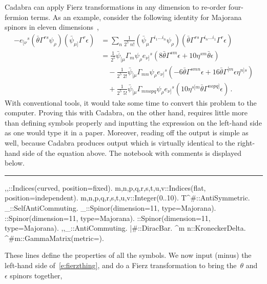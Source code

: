 \documentclass[11pt]{article}
\newenvironment{hanging}
    {\begin{list}{}{\setlength\itemsep{0pt}%
 \setlength\topsep{0pt}%
 \setlength\leftmargin{25pt}%
 \setlength\itemindent{0pt}%
 \setlength\listparindent{\itemindent}}%
     \item[]}
    {\end{list}}
\newcommand{\toprule}{\par\vspace{1ex}\noindent\hspace{25pt}\rule{435pt}{.1pt}}
\newenvironment{cdbin}{\fvset{firstnumber=1}\color[named]{Blue}\Verbatim}{\endVerbatim}
\newenvironment{cdbcom}{\begin{hanging}}{\end{hanging}}
\newcommand{\Cdb}{{Cadabra}\xspace}
\begin{document}
\Cdb can apply Fierz transformations in any dimension to re-order
four-fermion terms. As an example, consider the following identity for
Majorana spinors in eleven dimensions~\cite{deWit:1998tk},
\begin{equation}
\begin{aligned}
\label{e:fierzthing}
-e_{[\nu}{}^s (\bar \theta \Gamma^{rs} \psi_\rho)(\bar\psi_{\mu]} \Gamma^r \epsilon) &=
\sum_{n} \frac{1}{2^5\; n!} (\bar\psi_\mu \Gamma^{i_1\ldots i_n} \psi_\rho)
(\bar\theta \Gamma^{rs} \Gamma^{i_n\ldots i_1} \Gamma^{r} \epsilon) \\
&= \frac{1}{2^5} \bar\psi_{[\mu} \Gamma_m \psi_\rho e_{\nu]}{}^s \left( 8 \bar\theta \Gamma^{sm}\epsilon
+ 10 \eta^{sm} \bar\theta\epsilon\right) \\
&\quad - \frac{1}{2^5\; 2!} \bar\psi_{[\mu}\Gamma_{mn} \psi_\rho e_{\nu]}{}^s\left(
-6 \bar\theta\Gamma^{smn} \epsilon + 16\bar\theta \Gamma^{[m} \epsilon \eta^{n]s}\right)\\
&\quad + \frac{1}{2^5\; 5!} \bar\psi_{[\mu}\Gamma_{mnopq} \psi_\rho e_{\nu]}{}^s \left(
10 \eta^{s[m} \bar\theta\Gamma^{nopq]} \epsilon\right) \, .
\end{aligned}
\end{equation}
With conventional tools, it would take some time to convert this
problem to the computer. Proving this with \Cdb, on the other hand,
requires little more than defining symbols properly and inputting the
expression on the left-hand side as one would type it in a
paper. Moreover, reading off the output is simple as well, because \Cdb produces
output which is virtually identical to the right-hand side of the
equation above. The notebook with comments is displayed below.
\toprule
\begin{cdbin}
{\mu,\nu,\rho}::Indices(curved, position=fixed).
{m,n,p,q,r,s,t,u,v}::Indices(flat, position=independent).
{m,n,p,q,r,s,t,u,v}::Integer(0..10).
T^{#{\mu}}::AntiSymmetric.
\psi_{\mu}::SelfAntiCommuting.
\psi_{\mu}::Spinor(dimension=11, type=Majorana).
\theta::Spinor(dimension=11, type=Majorana).
\epsilon::Spinor(dimension=11, type=Majorana).
{\theta,\epsilon,\psi_{\mu}}::AntiCommuting.
\bar{#}::DiracBar.
\delta^{m n}::KroneckerDelta.
\Gamma^{#{m}}::GammaMatrix(metric=\delta).\end{cdbin}
\begin{cdbcom}
These lines define the properties of all the symbols. We now
input (minus) the left-hand side of~\eqref{e:fierzthing}, and do a Fierz
transformation to bring the~$\theta$ and~$\epsilon$ spinors together,
\end{cdbcom}
\end{document}
